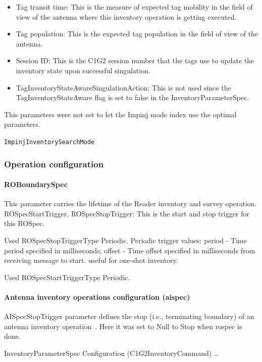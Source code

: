 \begin{itemize}
    \item Tag transit time: This is the measure of expected tag mobility in the field of view of the antenna where this inventory operation is getting executed.
    \item Tag population: This is the expected tag population in the field of view of the antenna.
    \item Session ID: This is the C1G2 session number that the tags use to update the inventory state upon successful singulation.
    \item  TagInventoryStateAwareSingulationAction: This is not used since the TagInventoryStateAware flag is set to false in the InventoryParameterSpec.
\end{itemize}

This parameters were not set to let the Impinj mode index use the optimal parameters.

\texttt{ImpinjInventorySearchMode}

\subsubsection{Operation configuration}

\paragraph{ROBoundarySpec}

This parameter carries the lifetime of the Reader inventory and survey operation.
ROSpecStartTrigger, ROSpecStopTrigger: This is the start and stop trigger for this ROSpec.

Used ROSpecStopTriggerType Periodic.
Periodic trigger values: period - Time period specified in milliseconds; offset - Time offset specified in milliseconds from receiving message to start. useful for one-shot inventory.

Used ROSpecStartTriggerType Periodic.

\paragraph{Antenna inventory operations configuration (\ac{aispec})}

AISpecStopTrigger parameter defines the stop (i.e., terminating boundary) of an antenna inventory operation~\cite[sec. 11.2.2.1]{LowLevelReader}. Here it was set to Null to Stop when \ac{rospec} is done.

InventoryParameterSpec Configuration (C1G2InventoryCommand) \dots



